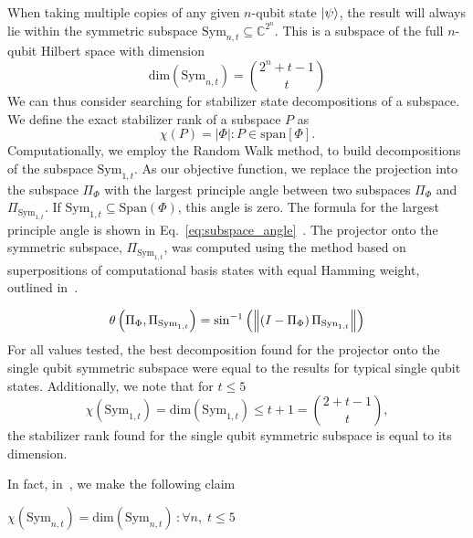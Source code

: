 When taking multiple copies of any given $n$-qubit state $\ket{\psi}$, the result will always lie within the symmetric subspace $\text{Sym}_{n,t}\subseteq \mathbb{C}^{2^{n}}$. This is a subspace of the full $n$-qubit Hilbert space with dimension
\begin{equation}
\text{dim}\left( \text{Sym}_{n,t}\right ) = \binom{2^{n}+t-1}{t}
\end{equation}
We can thus consider searching for stabilizer state decompositions of a subspace. We define the exact stabilizer rank of a subspace $P$ as
\begin{equation}
\chi\left(P\right) = \left| \Phi\right| : P\in \text{span}[\Phi].
\label{eq:subspace_srank}
\end{equation}
Computationally, we employ the Random Walk method, to build decompositions of the subspace $\text{Sym}_{1,t}$. As our objective function, we replace the projection into the subspace $\Pi_{\Phi}$ with the largest principle angle between two subspaces $\Pi_{\Phi}$ and $\Pi_{\text{Sym}_{1,t}}$. If $\text{Sym}_{1,t}\subseteq\text{Span}\left(\Phi\right)$, this angle is zero. The formula for the largest principle angle is shown in Eq.~\ref{eq:subspace_angle}~\cite{Knyazev2002}. The projector onto the symmetric subspace, $\Pi_{\text{Sym}_{1,t}}$, was computed using the method based on superpositions of computational basis states with equal Hamming weight, outlined in~\cite{Harrow2013}.\par
\begin{equation}
\theta\left(\Pi_{\Phi},\Pi_{\text{Sym}_{1,t}}\right)=\sin^{-1}\left(\norm{\left(I-\Pi_{\Phi}\right)\Pi_{\text{Syn}_{1,t}}}\right)
\label{eq:subspace_angle}
\end{equation}
For all values tested, the best decomposition found for the projector onto the single qubit symmetric subspace were equal to the results for typical single qubit states. Additionally, we note that for $t\leq 5$
\begin{equation}
\chi\left(\text{Sym}_{1,t}\right) = \text{dim}\left( \text{Sym}_{1,t}\right) \leq t+1 = \binom{2+t-1}{t},
\end{equation}
the stabilizer rank found for the single qubit symmetric subspace is equal to its dimension.\par
In fact, in~\cite{Bravyi2018}, we make the following claim
\begin{cla}
$\chi\left(\text{Sym}_{n,t}\right)=\text{dim}\left(\text{Sym}_{n,t}\right)\,:\forall n,\; t\leq 5$\label{cla:symmetric_srank}
\end{cla}
